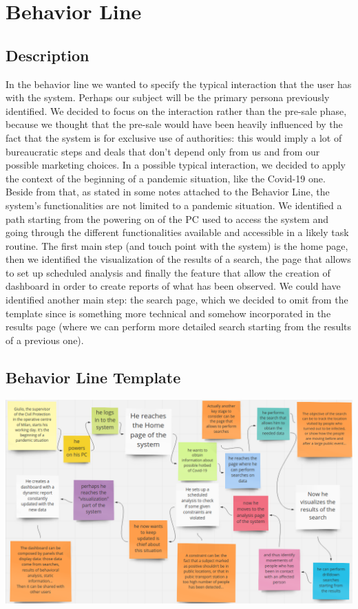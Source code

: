 \documentclass[../main.tex]{subfiles}
\begin{document}
    \chapter{Behavior Line}\label{ch:behavior-line}
    \section{Description}\label{sec:description2}
    In the behavior line we wanted to specify the typical interaction that the user has with the system. Perhaps our subject will be the primary persona previously identified. We decided to focus on the interaction rather than the pre-sale phase, because we thought that the pre-sale would have been heavily influenced by the fact that the system is for exclusive use of authorities: this would imply a lot of bureaucratic steps and deals that don’t depend only from us and from our possible marketing choices.
    In a possible typical interaction, we decided to apply the context of the beginning of a pandemic situation, like the Covid-19 one. Beside from that, as stated in some notes attached to the Behavior Line, the system’s functionalities are not limited to a pandemic situation.
    We identified a path starting from the powering on of the PC used to access the system and going through the different functionalities available and accessible in a likely task routine. The first main step (and touch point with the system) is the home page, then we identified the visualization of the results of a search, the page that allows to set up scheduled analysis and finally the feature that allow the creation of dashboard in order to create reports of what has been observed. We could have identified another main step: the search page, which we decided to omit from the template since is something more technical and somehow incorporated in the results page (where we can perform more detailed search starting from the results of a previous one).
    \section{Behavior Line Template}\label{sec:behavior-line-template}
    \includegraphics[scale = 0.4]{assets/behavior_line.png}
\end{document}
